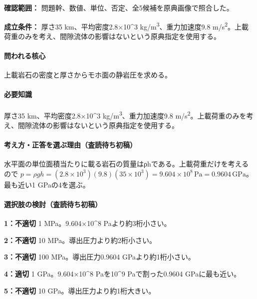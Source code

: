 \noindent\textbf{確認範囲：} 問題幹、数値、単位、否定、全5候補を原典画像で照合した。\par

\noindent\textbf{成立条件：} 厚さ35 km、平均密度2.8×10\textasciicircum{}3 kg/m\textsuperscript{3}、重力加速度9.8 m/s\textsuperscript{2}。上載荷重のみを考え、間隙流体の影響はないという原典指定を使用する。\par

\paragraph{問われる核心} 上載岩石の密度と厚さからモホ面の静岩圧を求める。

\paragraph{必要知識} 厚さ35 km、平均密度2.8×10\textasciicircum{}3 kg/m\textsuperscript{3}、重力加速度9.8 m/s\textsuperscript{2}。上載荷重のみを考え、間隙流体の影響はないという原典指定を使用する。

\paragraph{考え方・正答を選ぶ理由（査読待ち初稿）} 水平面の単位面積当たりに載る岩石の質量はρhである。上載荷重だけを考えるので \(p=\rho gh=(2.8\times10^3)(9.8)(35\times10^3)=9.604\times10^8\,\mathrm{Pa}=0.9604\,\mathrm{GPa}\)。最も近い1 GPaの4を選ぶ。

\paragraph{選択肢の検討（査読待ち初稿）}\mbox{}\par

\noindent\textbf{1：不適切} 1 MPa。9.604×10\textasciicircum{}8 Paより約3桁小さい。\par

\noindent\textbf{2：不適切} 10 MPa。導出圧力より約2桁小さい。\par

\noindent\textbf{3：不適切} 100 MPa。導出圧力0.9604 GPaより約1桁小さい。\par

\noindent\textbf{4：適切} 1 GPa。9.604×10\textasciicircum{}8 Paを10\textasciicircum{}9 Paで割った0.9604 GPaに最も近い。\par

\noindent\textbf{5：不適切} 10 GPa。導出圧力より約1桁大きい。\par

